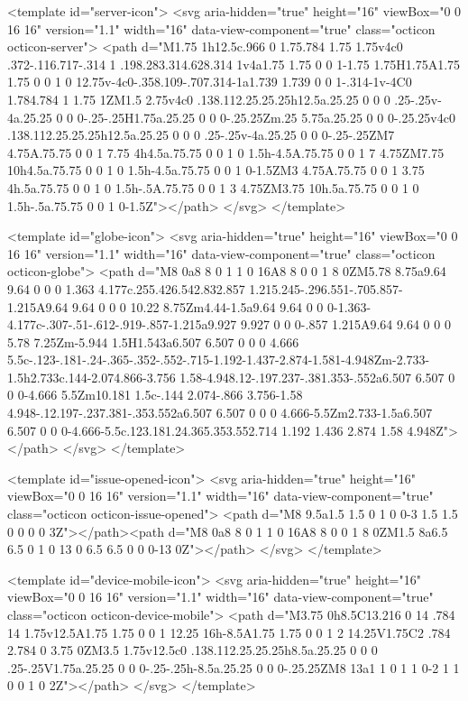 {{<template id="server-icon">
  <svg aria-hidden="true" height="16" viewBox="0 0 16 16" version="1.1" width="16" data-view-component="true" class="octicon octicon-server">
    <path d="M1.75 1h12.5c.966 0 1.75.784 1.75 1.75v4c0 .372-.116.717-.314 1 .198.283.314.628.314 1v4a1.75 1.75 0 0 1-1.75 1.75H1.75A1.75 1.75 0 0 1 0 12.75v-4c0-.358.109-.707.314-1a1.739 1.739 0 0 1-.314-1v-4C0 1.784.784 1 1.75 1ZM1.5 2.75v4c0 .138.112.25.25.25h12.5a.25.25 0 0 0 .25-.25v-4a.25.25 0 0 0-.25-.25H1.75a.25.25 0 0 0-.25.25Zm.25 5.75a.25.25 0 0 0-.25.25v4c0 .138.112.25.25.25h12.5a.25.25 0 0 0 .25-.25v-4a.25.25 0 0 0-.25-.25ZM7 4.75A.75.75 0 0 1 7.75 4h4.5a.75.75 0 0 1 0 1.5h-4.5A.75.75 0 0 1 7 4.75ZM7.75 10h4.5a.75.75 0 0 1 0 1.5h-4.5a.75.75 0 0 1 0-1.5ZM3 4.75A.75.75 0 0 1 3.75 4h.5a.75.75 0 0 1 0 1.5h-.5A.75.75 0 0 1 3 4.75ZM3.75 10h.5a.75.75 0 0 1 0 1.5h-.5a.75.75 0 0 1 0-1.5Z"></path>
</svg>
</template>

<template id="globe-icon">
  <svg aria-hidden="true" height="16" viewBox="0 0 16 16" version="1.1" width="16" data-view-component="true" class="octicon octicon-globe">
    <path d="M8 0a8 8 0 1 1 0 16A8 8 0 0 1 8 0ZM5.78 8.75a9.64 9.64 0 0 0 1.363 4.177c.255.426.542.832.857 1.215.245-.296.551-.705.857-1.215A9.64 9.64 0 0 0 10.22 8.75Zm4.44-1.5a9.64 9.64 0 0 0-1.363-4.177c-.307-.51-.612-.919-.857-1.215a9.927 9.927 0 0 0-.857 1.215A9.64 9.64 0 0 0 5.78 7.25Zm-5.944 1.5H1.543a6.507 6.507 0 0 0 4.666 5.5c-.123-.181-.24-.365-.352-.552-.715-1.192-1.437-2.874-1.581-4.948Zm-2.733-1.5h2.733c.144-2.074.866-3.756 1.58-4.948.12-.197.237-.381.353-.552a6.507 6.507 0 0 0-4.666 5.5Zm10.181 1.5c-.144 2.074-.866 3.756-1.58 4.948-.12.197-.237.381-.353.552a6.507 6.507 0 0 0 4.666-5.5Zm2.733-1.5a6.507 6.507 0 0 0-4.666-5.5c.123.181.24.365.353.552.714 1.192 1.436 2.874 1.58 4.948Z"></path>
</svg>
</template>

<template id="issue-opened-icon">
  <svg aria-hidden="true" height="16" viewBox="0 0 16 16" version="1.1" width="16" data-view-component="true" class="octicon octicon-issue-opened">
    <path d="M8 9.5a1.5 1.5 0 1 0 0-3 1.5 1.5 0 0 0 0 3Z"></path><path d="M8 0a8 8 0 1 1 0 16A8 8 0 0 1 8 0ZM1.5 8a6.5 6.5 0 1 0 13 0 6.5 6.5 0 0 0-13 0Z"></path>
</svg>
</template>

<template id="device-mobile-icon">
  <svg aria-hidden="true" height="16" viewBox="0 0 16 16" version="1.1" width="16" data-view-component="true" class="octicon octicon-device-mobile">
    <path d="M3.75 0h8.5C13.216 0 14 .784 14 1.75v12.5A1.75 1.75 0 0 1 12.25 16h-8.5A1.75 1.75 0 0 1 2 14.25V1.75C2 .784 2.784 0 3.75 0ZM3.5 1.75v12.5c0 .138.112.25.25.25h8.5a.25.25 0 0 0 .25-.25V1.75a.25.25 0 0 0-.25-.25h-8.5a.25.25 0 0 0-.25.25ZM8 13a1 1 0 1 1 0-2 1 1 0 0 1 0 2Z"></path>
</svg>
</template>

}}
